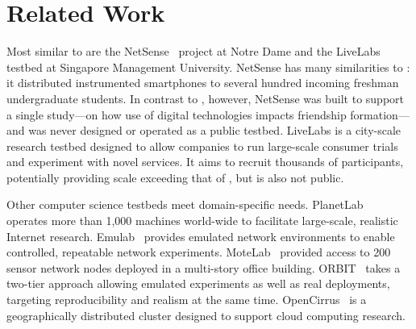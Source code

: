 \section{Related Work}
\label{sec:related}

Most similar to \PhoneLab{} are the NetSense~\cite{netsense-hotplanet}
project at Notre Dame and the LiveLabs~\cite{livelabs-url} testbed at
Singapore Management University. NetSense has many similarities to
\PhoneLab{}: it distributed instrumented smartphones to several hundred
incoming freshman undergraduate students. In contrast to \PhoneLab{},
however, NetSense was built to support a single study---on how use of digital
technologies impacts friendship formation---and was never designed or
operated as a public testbed. LiveLabs is a city-scale research testbed
designed to allow companies to run large-scale consumer trials and experiment
with novel services. It aims to recruit thousands of participants,
potentially providing scale exceeding that of \PhoneLab{}, but is also not
public.

Other computer science testbeds meet domain-specific needs.
PlanetLab~\cite{peterson:ccr:2003} operates more than 1,000 machines
world-wide to facilitate large-scale, realistic Internet research.
Emulab~\cite{white:osdi:2002} provides emulated network environments to
enable controlled, repeatable network experiments.
MoteLab~\cite{werner-allen:ipsn:2005} provided access to 200 sensor network
nodes deployed in a multi-story office building.
ORBIT~\cite{raychaudhuri:tridentcom:2005} takes a two-tier approach allowing
emulated experiments as well as real deployments, targeting reproducibility
and realism at the same time. OpenCirrus~\cite{avetisyan:computer:2010} is a
geographically distributed cluster designed to support cloud computing
research.

